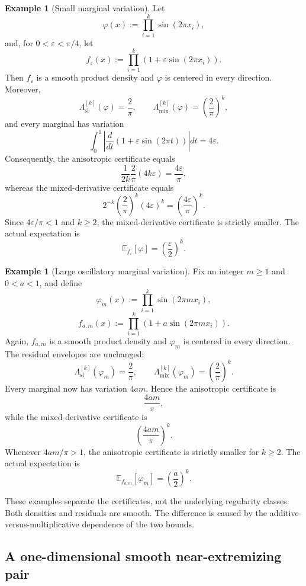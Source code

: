 \documentclass[11pt,letterpaper]{article}
\theoremstyle{definition}
\newtheorem{example}[theorem]{Example}
\theoremstyle{remark}
\begin{document}
\begin{example}[Small marginal variation]
\label{ex:appendix_mixed_certificate_better}
Let
$$
\varphi(x)
:=
\prod_{i=1}^k\sin(2\pi x_i),
$$
and, for $0<\varepsilon<\pi/4$, let
$$
f_\varepsilon(x)
:=
\prod_{i=1}^k
\left(1+\varepsilon\sin(2\pi x_i)\right).
$$
Then $f_\varepsilon$ is a smooth product density and $\varphi$ is centered in
every direction. Moreover,
$$
\Lambda_{\mathrm{sl}}^{[k]}(\varphi)=\frac2\pi,
\qquad
\Lambda_{\mathrm{mix}}^{[k]}(\varphi)
=\left(\frac2\pi\right)^k,
$$
and every marginal has variation
$$
\int_0^1
\left|\frac{d}{dt}
\left(1+\varepsilon\sin(2\pi t)\right)
\right|dt
=4\varepsilon.
$$
Consequently, the anisotropic certificate equals
$$
\frac{1}{2k}\frac2\pi(4k\varepsilon)
=\frac{4\varepsilon}{\pi},
$$
whereas the mixed-derivative certificate equals
$$
2^{-k}\left(\frac2\pi\right)^k(4\varepsilon)^k
=\left(\frac{4\varepsilon}{\pi}\right)^k.
$$
Since $4\varepsilon/\pi<1$ and $k\ge2$, the mixed-derivative certificate is
strictly smaller. The actual expectation is
$$
\mathbb E_{f_\varepsilon}[\varphi]
=\left(\frac\varepsilon2\right)^k.
$$
\end{example}

\begin{example}[Large oscillatory marginal variation]
\label{ex:appendix_tv_certificate_better}
Fix an integer $m\ge1$ and $0<a<1$, and define
$$
\varphi_m(x)
:=
\prod_{i=1}^k\sin(2\pi m x_i),
$$
$$
f_{a,m}(x)
:=
\prod_{i=1}^k
\left(1+a\sin(2\pi m x_i)\right).
$$
Again, $f_{a,m}$ is a smooth product density and $\varphi_m$ is centered in
every direction. The residual envelopes are unchanged:
$$
\Lambda_{\mathrm{sl}}^{[k]}(\varphi_m)=\frac2\pi,
\qquad
\Lambda_{\mathrm{mix}}^{[k]}(\varphi_m)
=\left(\frac2\pi\right)^k.
$$
Every marginal now has variation $4am$. Hence the anisotropic certificate is
$$
\frac{4am}{\pi},
$$
while the mixed-derivative certificate is
$$
\left(\frac{4am}{\pi}\right)^k.
$$
Whenever $4am/\pi>1$, the anisotropic certificate is strictly smaller for
$k\ge2$. The actual expectation is
$$
\mathbb E_{f_{a,m}}[\varphi_m]
=\left(\frac a2\right)^k.
$$
\end{example}

These examples separate the certificates, not the underlying regularity
classes. Both densities and residuals are smooth. The difference is caused by
the additive-versus-multiplicative dependence of the two bounds.

  
\subsection{A one-dimensional smooth near-extremizing pair}
\label{subsec:appendix_one_dimensional_near_extremizer}
  
\end{document}
